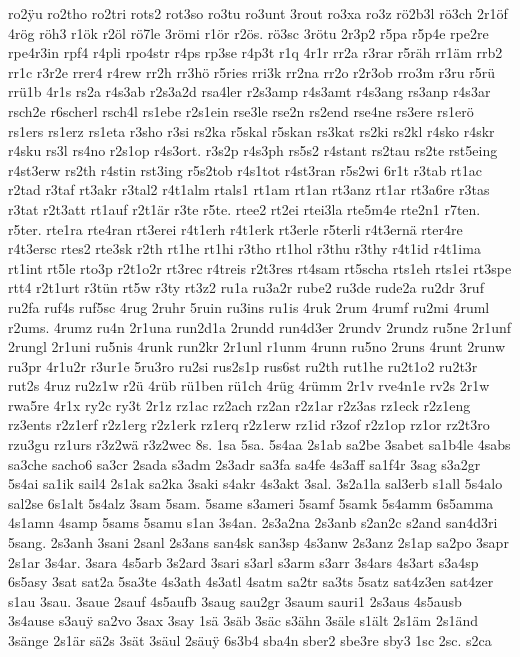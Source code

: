 {ro2^^ffu
ro2tho
ro2tri
rots2
rot3so
ro3tu
ro3unt
3rout
ro3xa
ro3z
rö2b3l
rö3ch
2r1öf
4rög
röh3
r1ök
r2öl
rö7le
3römi
r1ör
r2ös.
rö3sc
3rötu
2r3p2
r5pa
r5p4e
rpe2re
rpe4r3in
rpf4
r4pli
rpo4str
r4ps
rp3se
r4p3t
r1q
4r1r
rr2a
r3rar
r5räh
rr1äm
rrb2
rr1c
r3r2e
rrer4
r4rew
rr2h
rr3hö
r5ries
rri3k
rr2na
rr2o
r2r3ob
rro3m
r3ru
r5rü
rrü1b
4r1s
rs2a
r4s3ab
r2s3a2d
rsa4ler
r2s3amp
r4s3amt
r4s3ang
rs3anp
r4s3ar
rsch2e
r6scherl
rsch4l
rs1ebe
r2s1ein
rse3le
rse2n
rs2end
rse4ne
rs3ere
rs1erö
rs1ers
rs1erz
rs1eta
r3sho
r3si
rs2ka
r5skal
r5skan
rs3kat
rs2ki
rs2kl
r4sko
r4skr
r4sku
rs3l
rs4no
r2s1op
r4s3ort.
r3s2p
r4s3ph
rs5s2
r4stant
rs2tau
rs2te
rst5eing
r4st3erw
rs2th
r4stin
rst3ing
r5s2tob
r4s1tot
r4st3ran
r5s2wi
6r1t
r3tab
rt1ac
r2tad
r3taf
rt3akr
r3tal2
r4t1alm
rtals1
rt1am
rt1an
rt3anz
rt1ar
rt3a6re
r3tas
r3tat
r2t3att
rt1auf
r2t1är
r3te
r5te.
rtee2
rt2ei
rtei3la
rte5m4e
rte2n1
r7ten.
r5ter.
rte1ra
rte4ran
rt3erei
r4t1erh
r4t1erk
rt3erle
r5terli
r4t3ernä
rter4re
r4t3ersc
rtes2
rte3sk
r2th
rt1he
rt1hi
r3tho
rt1hol
r3thu
r3thy
r4t1id
r4t1ima
rt1int
rt5le
rto3p
r2t1o2r
rt3rec
r4treis
r2t3res
rt4sam
rt5scha
rts1eh
rts1ei
rt3spe
rtt4
r2t1urt
r3tün
rt5w
r3ty
rt3z2
ru1a
ru3a2r
rube2
ru3de
rude2a
ru2dr
3ruf
ru2fa
ruf4s
ruf5sc
4rug
2ruhr
5ruin
ru3ins
ru1is
4ruk
2rum
4rumf
ru2mi
4ruml
r2ums.
4rumz
ru4n
2r1una
run2d1a
2rundd
run4d3er
2rundv
2rundz
ru5ne
2r1unf
2rungl
2r1uni
ru5nis
4runk
run2kr
2r1unl
r1unm
4runn
ru5no
2runs
4runt
2runw
ru3pr
4r1u2r
r3ur1e
5ru3ro
ru2si
rus2s1p
rus6st
ru2th
rut1he
ru2t1o2
ru2t3r
rut2s
4ruz
ru2z1w
r2ü
4rüb
rü1ben
rü1ch
4rüg
4rümm
2r1v
rve4n1e
rv2s
2r1w
rwa5re
4r1x
ry2c
ry3t
2r1z
rz1ac
rz2ach
rz2an
r2z1ar
r2z3as
rz1eck
r2z1eng
rz3ents
r2z1erf
r2z1erg
r2z1erk
rz1erq
r2z1erw
rz1id
r3zof
r2z1op
rz1or
rz2t3ro
rzu3gu
rz1urs
r3z2wä
r3z2wec
8s.
1sa
5sa.
5s4aa
2s1ab
sa2be
3sabet
sa1b4le
4sabs
sa3che
sacho6
sa3cr
2sada
s3adm
2s3adr
sa3fa
sa4fe
4s3aff
sa1f4r
3sag
s3a2gr
5s4ai
sa1ik
sail4
2s1ak
sa2ka
3saki
s4akr
4s3akt
3sal.
3s2a1la
sal3erb
s1all
5s4alo
sal2se
6s1alt
5s4alz
3sam
5sam.
5same
s3ameri
5samf
5samk
5s4amm
6s5amma
4s1amn
4samp
5sams
5samu
s1an
3s4an.
2s3a2na
2s3anb
s2an2c
s2and
san4d3ri
5sang.
2s3anh
3sani
2sanl
2s3ans
san4sk
san3sp
4s3anw
2s3anz
2s1ap
sa2po
3sapr
2s1ar
3s4ar.
3sara
4s5arb
3s2ard
3sari
s3arl
s3arm
s3arr
3s4ars
4s3art
s3a4sp
6s5asy
3sat
sat2a
5sa3te
4s3ath
4s3atl
4satm
sa2tr
sa3ts
5satz
sat4z3en
sat4zer
s1au
3sau.
3saue
2sauf
4s5aufb
3saug
sau2gr
3saum
sauri1
2s3aus
4s5ausb
3s4ause
s3au^^ff
sa2vo
3sax
3say
1sä
3säb
3säc
s3ähn
3säle
s1ält
2s1äm
2s1änd
3sänge
2s1är
sä2s
3sät
3säul
2säu^^ff
6s3b4
sba4n
sber2
sbe3re
sby3
1sc
2sc.
s2ca
}
